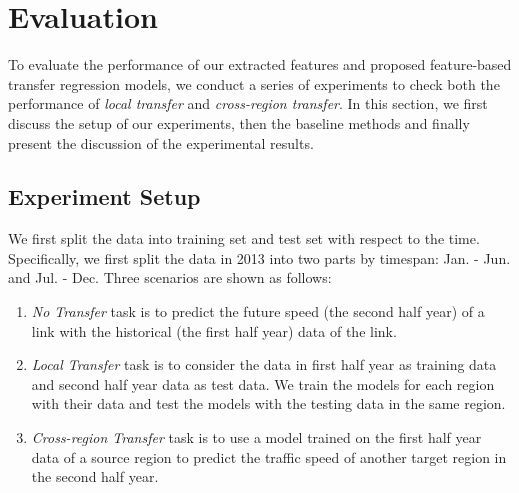\section{Evaluation}
To evaluate the performance of our extracted features and proposed feature-based transfer regression models, we conduct a series of experiments to check both the performance of \textit{local transfer} and \textit{cross-region transfer}.
In this section, we first discuss the setup of our experiments, then the baseline methods and finally present the discussion of the experimental results.
\subsection{Experiment Setup}
We first split the data into training set and test set with respect to the time. 
Specifically, we first split the data in 2013 into two parts by timespan: Jan. - Jun. and Jul. - Dec.
Three scenarios are shown as follows:
\begin{enumerate}
\item \textit{{No Transfer}} task is to predict the future speed  (the second half year) of a link with the historical (the first half year) data of the link.		
\item \textit{{Local Transfer}} task is to consider the data in first half year as training data and second half year data as test data. 
We train the models for each region with their data and test the models with the testing data in the same region. 
\item \textit{{Cross-region Transfer}} task is to use a model trained on the first half year data of a source region to predict the traffic speed of another target region in the second half year.
\end{enumerate}

